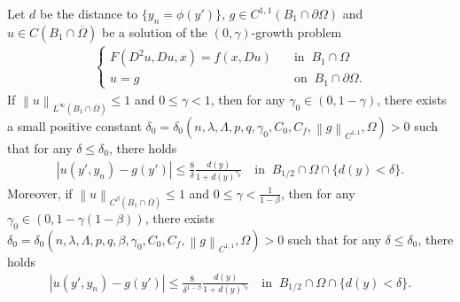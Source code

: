 \documentclass[10pt,a4paper]{amsart}
\newcommand{\norm}[1]{\left\lVert#1\right\rVert}
\begin{document}
\begin{lem} \label{bar}
    Let $d$ be the distance to $\{y_n = \phi(y')\}$, $g\in C^{1,1}(B_1\cap\partial\Omega)$ and $u \in C(B_1\cap\overline{\Omega })$ be a solution of the $(0,\gamma)$-growth problem
    \begin{align*}
        \begin{cases}
        F(D^2u,Du,x) = f(x,Du) \quad &\text{in } \ B_1\cap \Omega \\
        u=g\quad &\text{on } \ B_1\cap \partial \Omega.
        \end{cases}
    \end{align*} 
    If $\norm{u}_{L^\infty(B_1\cap\overline{\Omega})} \leq 1$ and $0\leq\gamma < 1$, then for any $\gamma_0 \in (0, 1-\gamma)$, there exists a small positive constant $\delta_0=\delta_0(n, \lambda, \Lambda, p, q, \gamma_0,C_0,C_f, \norm{g}_{C^{1,1}},\Omega)>0$ such that for any $\delta\leq\delta_0$, there holds
    \begin{align*}
        |u(y',y_n)-g(y')| \leq \frac{8}{\delta}\frac{d(y)}{1+d(y)^{\gamma_0}} \quad \text{in } \ B_{1/2} \cap\Omega \cap \{d(y)<\delta\}.
    \end{align*}
    Moreover, if $\norm{u}_{C^\beta(B_1\cap\overline{\Omega})} \leq 1$ and $0\leq\gamma < \frac{1}{1-\beta}$, then for any $\gamma_0 \in (0, 1-\gamma(1-\beta))$, there exists $\delta_0=\delta_0(n, \lambda, \Lambda, p, q, \beta, \gamma_0, C_0, C_f, \norm{g}_{C^{1,1}},\Omega)>0$ such that for any $\delta\leq \delta_0$, there holds
    \begin{align*}
        |u(y',y_n)-g(y')| \leq \frac{8}{\delta^{1-\beta}}\frac{d(y)}{1+d(y)^{\gamma_0}} \quad \text{in } \ B_{1/2} \cap\Omega \cap \{d(y)<\delta\}.
    \end{align*}
\end{lem}
\end{document}
